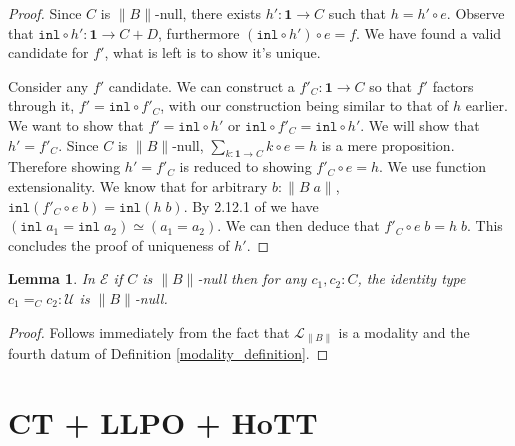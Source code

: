 \documentclass[12pt]{report}
\newtheorem{lem}[thm]{Lemma}
\begin{document}
\begin{proof}
Since $C$ is $\lVert B \rVert$-null, there exists $h' : \mathbf{1} \rightarrow C$ such that $h = h' \circ e$. 
Observe that $\mathtt{inl} \circ h' : \mathbf{1} \rightarrow C+D$, furthermore $(\mathtt{inl} \circ h') \circ e= f$. 
We have found a valid candidate for $f'$, what is left is to show it's unique. 

Consider any $f'$ candidate. 
We can construct a $f'_C : \mathbf{1} \rightarrow C$ so that $f'$ factors through it, $f' = \mathtt{inl} \circ f'_C$, with our construction being similar to that of $h$ earlier. 
We want to show that $f' = \mathtt{inl} \circ h'$ or $\mathtt{inl} \circ f'_C = \mathtt{inl} \circ h'$. 
We will show that $h' = f'_C$. 
Since $C$ is $\lVert B \rVert$-null, $\sum_{k : \mathbf{1} \rightarrow C} k \circ e = h$ is a mere proposition. 
Therefore showing $h' = f'_C$ is reduced to showing $f'_C \circ e = h$. 
We use function extensionality. 
We know that for arbitrary $b : \lVert B\; a \rVert$, $\mathtt{inl} (f'_C \circ e\; b ) = \mathtt{inl} (h\; b)$. 
By 2.12.1 of \cite{hottbook} we have $(\mathtt{inl}\; a_1 = \mathtt{inl}\; a_2) \simeq (a_1 = a_2)$. 
We can then deduce that $f'_C\circ e\; b = h\; b$. This concludes the proof of uniqueness of $h'$.

\end{proof}

\begin{lem}
In $\mathcal{E}$ if $C$ is $\lVert B \rVert$-null then for any $c_1, c_2 : C$, the identity type $c_1=_C c_2 : \mathcal{U}$ is $\lVert B\rVert$-null. 
\end{lem}
\begin{proof}
Follows immediately from the fact that $\mathcal{L}_{\lVert B \rVert}$ is a modality and the fourth datum of Definition \ref{modality_definition}.
\end{proof}

\section{CT + LLPO + HoTT}
\end{document}
